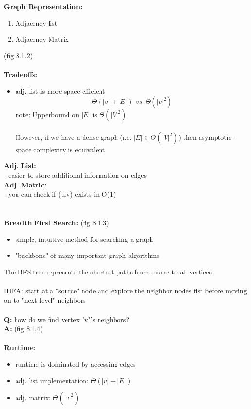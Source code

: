 \documentclass{article}
\begin{document}
	\textbf{Graph Representation:}\begin{enumerate}
		\item Adjacency list
		\item Adjacency Matrix
	\end{enumerate}
	(fig 8.1.2)\\\\
	\textbf{Tradeoffs:}\begin{itemize}
		\item adj. list is more space efficient
		$$ \Theta(|v| + |E|)~~vs~~\Theta(|v|^2)$$
		note: Upperbound on $|E|$ is $\Theta(|V|^2)$\\\\
		However, if we have a dense graph (i.e. $|E|\in\Theta(|V|^2)$) then asymptotic-space complexity is equivalent\\
	\end{itemize}
	\textbf{Adj. List:\\}
	- easier to store additional information on edges\\
	\textbf{Adj. Matric:\\}
	- you can check if (u,v) exists in O(1)\\\\\\
	
	\textbf{Breadth First Search:} (fig 8.1.3)\begin{itemize}
		\item simple, intuitive method for searching a graph
		\item "backbone" of many important graph algorithms
	\end{itemize}
	The BFS tree represents the shortest paths from source to all vertices\\\\
	
	\underline{IDEA:} start at a "source" node and explore the neighbor nodes fist before moving on to "next level" neighbors\\\\
	\textbf{Q:} how do we find vertex "v"'s neighbors?\\
	\textbf{A:} (fig 8.1.4)\\\\
	
	\textbf{Runtime:}\begin{itemize}
		\item runtime is dominated by accessing edges
		\item adj. list implementation: $\Theta(|v| + |E|)$
		\item adj. matrix: $\Theta(|v|^2)$\\\\ 
	\end{itemize}
	
\end{document}
